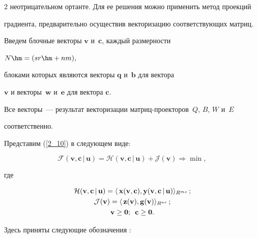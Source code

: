 \begin{multicols}{2}
неотрицательном ортанте. Для ее решения можно применить метод проекций 


градиента, предварительно осуществив векторизацию соответствующих матриц.





Введем блочные векторы $\mathbf{v}$ и~$\mathbf{c}$, каждый размерности


$N\hm = (sr \hm+ nm),$


блоками которых являются векторы $\mathbf{q}$ и~$\mathbf{b}$ для вектора 


$\mathbf{v}$ и векторы~$\mathbf{w}$ и~$\mathbf{e}$ для вектора $\mathbf{c}$. 


Все векторы~--- результат векторизации мат\-риц-про\-ек\-то\-ров~$Q$, $B$, $W$ и~$E$ 


соответственно.





Представим (\ref{2_10})  в следующем виде:


\begin{equation*}




\mathcal{F}(\mathbf{v}, \mathbf{c}\,|\,\mathbf{u}) = \mathcal{H}(\mathbf{v}, 


\mathbf{c}\,|\,\mathbf{u}) + \mathcal{J}(\mathbf{v}) \Rightarrow \min,


\end{equation*}


где


\begin{gather*}


\mathcal{H}(\mathbf{v}, \mathbf{c}\,|\,\mathbf{u}) = 


\langle\,\mathbf{x}(\mathbf{v}, \mathbf{c}), \mathbf{y}(\mathbf{v}, 


\mathbf{c}\,|\,\mathbf{u})\rangle_{R^{ms}}\,;\\


\mathcal{J}(\mathbf{v}) = \langle\,\mathbf{z}(\mathbf{v}),  


\mathbf{g}(\mathbf{v}) \rangle_{R^{nr}}\,;\\


\mathbf{v} \geq  \mathbf{0};\enskip \mathbf{c} \geq  \mathbf{0}.


\end{gather*}





Здесь приняты следующие обозначения \cite{Magnus_1988}:



\end{multicols}
